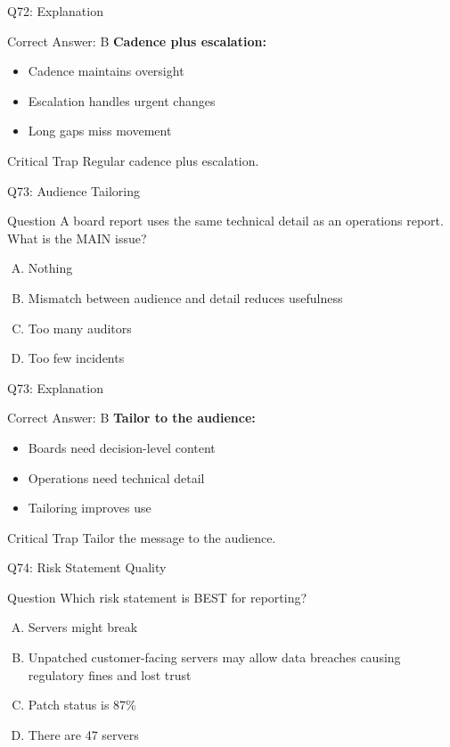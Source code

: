 \documentclass{beamer}
\begin{document}
	\begin{frame}{Q72: Explanation}
		\begin{block}{Correct Answer: B}
			\textbf{Cadence plus escalation:}
			\begin{itemize}
				\item Cadence maintains oversight
				\item Escalation handles urgent changes
				\item Long gaps miss movement
			\end{itemize}
		\end{block}
		\begin{alertblock}{Critical Trap}
			Regular cadence plus escalation.
		\end{alertblock}
	\end{frame}
	
	\begin{frame}{Q73: Audience Tailoring}
		\begin{block}{Question}
			A board report uses the same technical detail as an operations report. What is the MAIN issue?
		\end{block}
		\begin{enumerate}[(A)]
			\item Nothing
			\item Mismatch between audience and detail reduces usefulness
			\item Too many auditors
			\item Too few incidents
		\end{enumerate}
	\end{frame}
	
	\begin{frame}{Q73: Explanation}
		\begin{block}{Correct Answer: B}
			\textbf{Tailor to the audience:}
			\begin{itemize}
				\item Boards need decision-level content
				\item Operations need technical detail
				\item Tailoring improves use
			\end{itemize}
		\end{block}
		\begin{alertblock}{Critical Trap}
			Tailor the message to the audience.
		\end{alertblock}
	\end{frame}
	
	\begin{frame}{Q74: Risk Statement Quality}
		\begin{block}{Question}
			Which risk statement is BEST for reporting?
		\end{block}
		\begin{enumerate}[(A)]
			\item Servers might break
			\item Unpatched customer-facing servers may allow data breaches causing regulatory fines and lost trust
			\item Patch status is 87\%
			\item There are 47 servers
		\end{enumerate}
	\end{frame}
	
\end{document}

